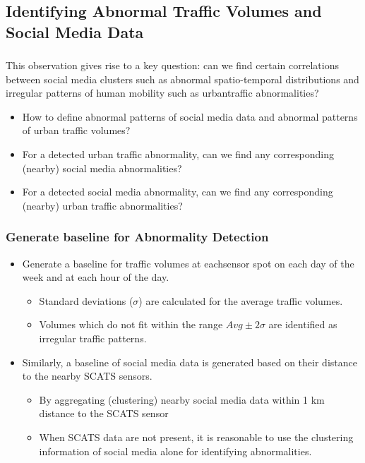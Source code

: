 \subsection{Identifying Abnormal Traffic Volumes and Social Media Data}
\begin{frame}
    \frametitle{}
    This observation gives rise to a key question: can we find certain correlations between social media clusters such as abnormal spatio-temporal distributions and irregular patterns of human mobility such as urbantraffic abnormalities?
    \begin{itemize} \small
        \item How to define abnormal patterns of social media data and  abnormal patterns of urban traffic volumes?
        \item For a detected urban traffic abnormality, can we find any corresponding (nearby) social media abnormalities?
        \item For a detected social media abnormality, can we find any corresponding (nearby) urban traffic abnormalities?
    \end{itemize}
\end{frame}

\begin{frame}
    \frametitle{Generate baseline for Abnormality Detection}
    \begin{itemize}
	    \item Generate a baseline for traffic volumes at eachsensor spot on each day of the week and at each hour of the day.
	    \begin{itemize} \small
	        \item Standard deviations ($\sigma$) are calculated for the average traffic volumes.
	        \item Volumes which do not fit within the range $Avg\pm2\sigma$ are identified as irregular traffic patterns.
	    \end{itemize}
	    \item Similarly, a baseline of social media data is generated based on their distance to the nearby SCATS sensors.
	    \begin{itemize} \small
	        \item By aggregating (clustering) nearby social media data within 1 km distance to the SCATS sensor
	        \item When SCATS data are not present, it is reasonable to use the clustering information of social media alone for identifying abnormalities.
	    \end{itemize}
    \end{itemize}
\end{frame}

